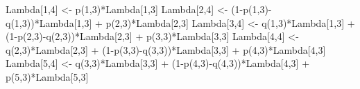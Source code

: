 \documentclass[]{tufte-book}
\newenvironment{Shaded}{}{}
\newcommand{\DecValTok}[1]{\textcolor[rgb]{0.25,0.63,0.44}{#1}}
\newcommand{\FunctionTok}[1]{\textcolor[rgb]{0.02,0.16,0.49}{#1}}
\newcommand{\NormalTok}[1]{#1}
\newcommand{\OtherTok}[1]{\textcolor[rgb]{0.00,0.44,0.13}{#1}}
\newcommand{\SpecialCharTok}[1]{\textcolor[rgb]{0.25,0.44,0.63}{#1}}
\begin{document}
\begin{Shaded}
\begin{Highlighting}[]
\NormalTok{  Lambda[}\DecValTok{1}\NormalTok{,}\DecValTok{4}\NormalTok{] }\OtherTok{\textless{}{-}} \FunctionTok{p}\NormalTok{(}\DecValTok{1}\NormalTok{,}\DecValTok{3}\NormalTok{)}\SpecialCharTok{*}\NormalTok{Lambda[}\DecValTok{1}\NormalTok{,}\DecValTok{3}\NormalTok{]}
\NormalTok{  Lambda[}\DecValTok{2}\NormalTok{,}\DecValTok{4}\NormalTok{] }\OtherTok{\textless{}{-}}\NormalTok{ (}\DecValTok{1}\SpecialCharTok{{-}}\FunctionTok{p}\NormalTok{(}\DecValTok{1}\NormalTok{,}\DecValTok{3}\NormalTok{)}\SpecialCharTok{{-}}\FunctionTok{q}\NormalTok{(}\DecValTok{1}\NormalTok{,}\DecValTok{3}\NormalTok{))}\SpecialCharTok{*}\NormalTok{Lambda[}\DecValTok{1}\NormalTok{,}\DecValTok{3}\NormalTok{] }\SpecialCharTok{+} \FunctionTok{p}\NormalTok{(}\DecValTok{2}\NormalTok{,}\DecValTok{3}\NormalTok{)}\SpecialCharTok{*}\NormalTok{Lambda[}\DecValTok{2}\NormalTok{,}\DecValTok{3}\NormalTok{]}
\NormalTok{  Lambda[}\DecValTok{3}\NormalTok{,}\DecValTok{4}\NormalTok{] }\OtherTok{\textless{}{-}} \FunctionTok{q}\NormalTok{(}\DecValTok{1}\NormalTok{,}\DecValTok{3}\NormalTok{)}\SpecialCharTok{*}\NormalTok{Lambda[}\DecValTok{1}\NormalTok{,}\DecValTok{3}\NormalTok{] }\SpecialCharTok{+}\NormalTok{ (}\DecValTok{1}\SpecialCharTok{{-}}\FunctionTok{p}\NormalTok{(}\DecValTok{2}\NormalTok{,}\DecValTok{3}\NormalTok{)}\SpecialCharTok{{-}}\FunctionTok{q}\NormalTok{(}\DecValTok{2}\NormalTok{,}\DecValTok{3}\NormalTok{))}\SpecialCharTok{*}\NormalTok{Lambda[}\DecValTok{2}\NormalTok{,}\DecValTok{3}\NormalTok{] }\SpecialCharTok{+} \FunctionTok{p}\NormalTok{(}\DecValTok{3}\NormalTok{,}\DecValTok{3}\NormalTok{)}\SpecialCharTok{*}\NormalTok{Lambda[}\DecValTok{3}\NormalTok{,}\DecValTok{3}\NormalTok{]}
\NormalTok{  Lambda[}\DecValTok{4}\NormalTok{,}\DecValTok{4}\NormalTok{] }\OtherTok{\textless{}{-}} \FunctionTok{q}\NormalTok{(}\DecValTok{2}\NormalTok{,}\DecValTok{3}\NormalTok{)}\SpecialCharTok{*}\NormalTok{Lambda[}\DecValTok{2}\NormalTok{,}\DecValTok{3}\NormalTok{] }\SpecialCharTok{+}\NormalTok{ (}\DecValTok{1}\SpecialCharTok{{-}}\FunctionTok{p}\NormalTok{(}\DecValTok{3}\NormalTok{,}\DecValTok{3}\NormalTok{)}\SpecialCharTok{{-}}\FunctionTok{q}\NormalTok{(}\DecValTok{3}\NormalTok{,}\DecValTok{3}\NormalTok{))}\SpecialCharTok{*}\NormalTok{Lambda[}\DecValTok{3}\NormalTok{,}\DecValTok{3}\NormalTok{] }\SpecialCharTok{+} \FunctionTok{p}\NormalTok{(}\DecValTok{4}\NormalTok{,}\DecValTok{3}\NormalTok{)}\SpecialCharTok{*}\NormalTok{Lambda[}\DecValTok{4}\NormalTok{,}\DecValTok{3}\NormalTok{]}
\NormalTok{  Lambda[}\DecValTok{5}\NormalTok{,}\DecValTok{4}\NormalTok{] }\OtherTok{\textless{}{-}} \FunctionTok{q}\NormalTok{(}\DecValTok{3}\NormalTok{,}\DecValTok{3}\NormalTok{)}\SpecialCharTok{*}\NormalTok{Lambda[}\DecValTok{3}\NormalTok{,}\DecValTok{3}\NormalTok{] }\SpecialCharTok{+}\NormalTok{ (}\DecValTok{1}\SpecialCharTok{{-}}\FunctionTok{p}\NormalTok{(}\DecValTok{4}\NormalTok{,}\DecValTok{3}\NormalTok{)}\SpecialCharTok{{-}}\FunctionTok{q}\NormalTok{(}\DecValTok{4}\NormalTok{,}\DecValTok{3}\NormalTok{))}\SpecialCharTok{*}\NormalTok{Lambda[}\DecValTok{4}\NormalTok{,}\DecValTok{3}\NormalTok{] }\SpecialCharTok{+} \FunctionTok{p}\NormalTok{(}\DecValTok{5}\NormalTok{,}\DecValTok{3}\NormalTok{)}\SpecialCharTok{*}\NormalTok{Lambda[}\DecValTok{5}\NormalTok{,}\DecValTok{3}\NormalTok{]}

\end{Highlighting}
\end{Shaded}
\end{document}
